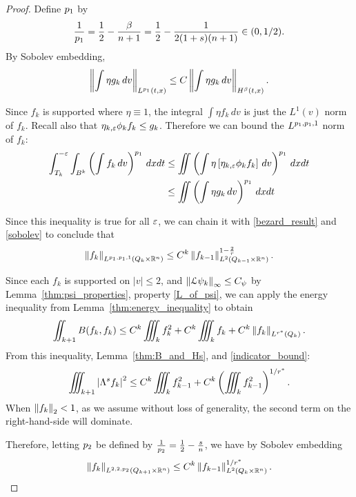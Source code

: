 \begin{proof}
Define ${p_1}$ by
\[ \frac{1}{{p_1}} = \frac{1}{2} - \frac{\beta}{n+1} = \frac{1}{2} - \frac{1}{2(1+s)(n+1)} \in (0,1/2). \]
By Sobolev embedding,
\begin{equation}\label{sobolev}
\left\lVert \int \eta g_k \,dv\right\rVert_{L^{p_1}(t,x)} \leq C \left\lVert \int \eta g_k \,dv\right\rVert_{H^\beta(t,x)}. 
\end{equation} 

Since $f_k$ is supported where $\eta \equiv 1$, the integral $\int \eta f_k \,dv$ is just the $L^1(v)$ norm of $f_k$.  Recall also that $\eta_{k,\varepsilon} \phi_k f_k \leq g_k$.  Therefore we can bound the $L^{{p_1},{p_1},1}$ norm of $f_k$:
\begin{align*}
\int_{T_k}^{-\eps} \int_{B^k} \paren{ \int f_k \,dv}^\txexp \, dxdt %
 &\leq \iint \paren{ \int \eta \bracket{\etak \phi_k f_k} \,dv}^\txexp \, dxdt
\\ &\leq \iint \paren{ \int \eta g_k \,dv}^\txexp \, dxdt
\end{align*}


Since this inequality is true for all $\varepsilon$, we can chain it with \eqref{bezard_result} and \eqref{sobolev} to conclude that
\begin{equation}\label{t_and_x_integrability}
\left\lVert f_k\right\rVert_{L^{{p_1},{p_1},1}(Q_k \times \mathbb{R}^n)} \leq C^k \left\lVert f_{k-1}\right\rVert_{L^2(Q_{k-1} \times \mathbb{R}^n)}^{1-\frac{2}{{r}}}. 
\end{equation}



Since each $f_k$ is supported on $|v|\leq 2$, and $\left\lVert\mathcal{L}\psi_k\right\rVert_\infty \leq C_\psi$ by Lemma~\ref{thm:psi_properties}, property \eqref{L_of_psi}, we can apply the energy inequality from Lemma~\ref{thm:energy_inequality} to obtain
\[ \iint_{k+1} B(f_k,f_k) \leq C^k \iiint_k f_k^2 + C^k \iiint_k f_k + C^k \left\lVert f_k\right\rVert_{L^{{r}^\ast}(Q_k)}. \]
From this inequality, Lemma~\ref{thm:B_and_Hs}, and \eqref{indicator_bound}:
\[ \iiint_{k+1} \left\lvert \Lambda^s f_k \right\rvert^2 \leq C^k \iiint_k f_{k-1}^2 + C^k \left( \iiint_k f_{k-1}^2 \right)^{1/{r}^\ast}. \]
When $\left\lVert f_k\right\rVert_2 < 1$, as we assume without loss of generality, the second term on the right-hand-side will dominate.  

Therefore, letting ${p_2}$ be defined by $\frac{1}{{p_2}} = \frac{1}{2} - \frac{s}{n}$, we have by Sobolev embedding
\begin{equation}\label{v_integration} 
\left\lVert f_k\right\rVert_{L^{2,2,{p_2}}(Q_{k+1} \times \mathbb{R}^n)} \leq C^k \left\lVert f_{k-1}\right\rVert_{L^2(Q_k \times \mathbb{R}^n)}^{1/{r}^\ast}. 
\end{equation}


\end{proof}

